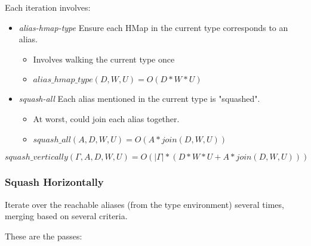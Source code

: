 Each iteration involves:

\begin{itemize}
  \item \emph{alias-hmap-type} Ensure each HMap in the current type corresponds to an alias.
		\begin{itemize}
			\item Involves walking the current type once
			\item $alias\_hmap\_type(D,W,U) = O(D*W*U)$
		\end{itemize}
  \item \emph{squash-all} Each alias mentioned in the current type is "squashed".
		\begin{itemize}
			\item At worst, could join each alias together.
			\item $squash\_all(A,D,W,U) = O(A*join(D, W, U))$
		\end{itemize}
\end{itemize}

\[
squash\_vertically(\Gamma, A, D, W, U) = O(|\Gamma| * (D*W*U + A*join(D, W, U)))
\]

\subsubsection{Squash Horizontally}

Iterate over the reachable aliases (from the type environment)
several times, merging based on several criteria.

These are the passes:

